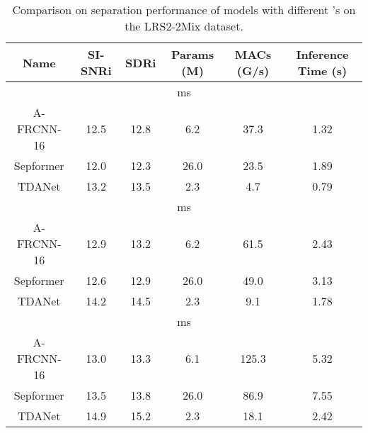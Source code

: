 \documentclass{article} \usepackage{iclr2023_conference,times}
\begin{document}
\begin{table}[ht]
\caption{Comparison on separation performance of models with different 's on the LRS2-2Mix dataset.}
\label{table:L}
\begin{center}
\begin{tabular}{cccccc}
\toprule
Name       & SI-SNRi & SDRi & Params (M) & MACs (G/s) & Inference Time (s) \\
\midrule
\multicolumn{6}{c}{ ms}                                                 \\
\midrule
A-FRCNN-16 & 12.5    & 12.8 & 6.2        & 37.3       & 1.32               \\
Sepformer  & 12.0    & 12.3 & 26.0       & 23.5       & 1.89               \\
TDANet     & 13.2    & 13.5 & 2.3        & 4.7        & 0.79               \\
\midrule
\multicolumn{6}{c}{ ms}                                                 \\
\midrule
A-FRCNN-16 & 12.9    & 13.2 & 6.2        & 61.5       & 2.43               \\
Sepformer  & 12.6    & 12.9 & 26.0       & 49.0       & 3.13               \\
TDANet     & 14.2    & 14.5 & 2.3        & 9.1        & 1.78               \\
\midrule
\multicolumn{6}{c}{ ms}                                                 \\
\midrule
A-FRCNN-16 & 13.0    & 13.3 & 6.1        & 125.3      & 5.32               \\
Sepformer  & 13.5    & 13.8 & 26.0       & 86.9       & 7.55               \\
TDANet     & 14.9    & 15.2 & 2.3        & 18.1       & 2.42               \\
\bottomrule
\end{tabular}
\end{center}
\end{table}
\end{document}

